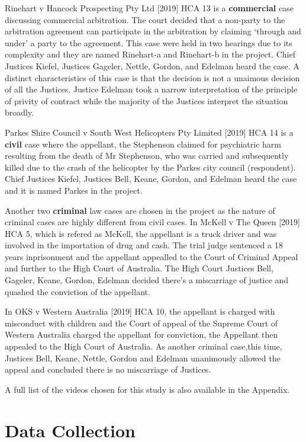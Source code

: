 \documentclass{monashthesis}
\begin{document}
Rinehart v Hancock Prospecting Pty Ltd {[}2019{]} HCA 13 is a \textbf{commercial} case discussing commercial arbitration. The court decided that a non-party to the arbitration agreement can participate in the arbitration by claiming `through and under' a party to the agreement. This case were held in two hearings due to its complexity and they are named Rinehart-a and Rinehart-b in the project. Chief Justices Kiefel, Justices Gageler, Nettle, Gordon, and Edelman heard the case. A distinct characteristics of this case is that the decision is not a unaimous decision of all the Justices. Justice Edelman took a narrow interpretation of the principle of privity of contract while the majority of the Justices interpret the situation broadly.

Parkes Shire Council v South West Helicopters Pty Limited {[}2019{]} HCA 14 is a \textbf{civil} case where the appellant, the Stephenson claimed for psychiatric harm resulting from the death of Mr Stephenson, who was carried and subsequently killed due to the crash of the helicopter by the Parkes city council (respondent). Chief Justices Kiefel, Justices Bell, Keane, Gordon, and Edelman heard the case and it is named Parkes in the project.

Another two \textbf{criminal} law cases are chosen in the project as the nature of criminal cases are highly different from civil cases. In McKell v The Queen {[}2019{]} HCA 5, which is refered as McKell, the appellant is a truck driver and was involved in the importation of drug and cash. The trial judge sentenced a 18 years inprisonment and the appellant appealled to the Court of Criminal Appeal and further to the High Court of Australia. The High Court Justices Bell, Gageler, Keane, Gordon, Edelman decided there's a miscarriage of justice and quashed the conviction of the appellant.

In OKS v Western Australia {[}2019{]} HCA 10, the appellant is charged with misconduct with children and the Court of appeal of the Supreme Court of Western Australia charged the appellant for conviction, the Appellant then appealed to the High Court of Australia. As another criminal case,this time, Justices Bell, Keane, Nettle, Gordon and Edelman unanimously allowed the appeal and concluded there is no miscarriage of Justices.

A full list of the videos chosen for this study is also available in the Appendix.

\let\cleardoublepage\clearpage

\hypertarget{data-collection}{%
\chapter{Data Collection}\label{data-collection}}
\end{document}
